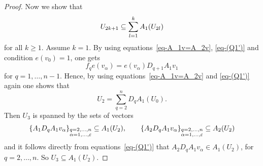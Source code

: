 \begin{proof}
Now we show that
\begin{equation}
U_{2k+1}\subseteq \sum_{l=1}^{k}A_{1}(U_{2l})
\label{eq-V_(2k+1)-in-imA_{1}}
\end{equation}
for all $k\geq 1$.
Assume $k=1$. By using equations~\eqref{eq-A_1v=A_2v}, \eqref{eq-(Q1')} and condition $e(v_{0})=1$, one gets
\begin{equation*}
f_{q}e(v_{\alpha})=e(v_{\alpha})D_{q+1}A_{1}v_{1}
\end{equation*}
for $q=1,\dots,n-1$. Hence, by using equations~\eqref{eq-A_1v=A_2v} and \eqref{eq-(Q1')} again one shows that
\begin{equation*}
U_{2}= \sum_{q=2}^{n}D_{q}A_{1}(U_{0}) .
\end{equation*}
 Then $U_{3}$ is spanned by the sets of vectors
\begin{equation*}
\{A_{1}D_{q}A_{1}v_{\alpha}\}_{\begin{subarray}{l} q=2,\dots,n \\ \alpha=1,\dots,\varepsilon \end{subarray}}\subseteq A_{1}(U_{2}) ,\qquad
\{A_{2}D_{q}A_{1}v_{\alpha}\}_{\begin{subarray}{l} q=2,\dots,n \\ \alpha=1,\dots,\varepsilon \end{subarray}}\subseteq A_{2}(U_{2})
\end{equation*}
and it follows directly from equations~\eqref{eq-(Q1')} that
$A_{2}D_{q}A_{1}v_{\alpha} \in A_{1}(U_{2})$, for $q=2,\dots,n$. So $U_3\subseteq A_1(U_2)$.


\end{proof}
